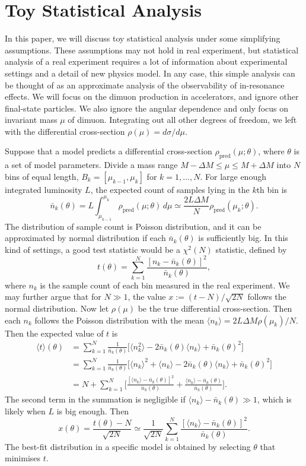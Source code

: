 \documentclass[11pt]{article}
\theoremstyle{definition}
\theoremstyle{remark}
\begin{document}
	\section{Toy Statistical Analysis}
	In this paper, we will discuss toy statistical analysis under some simplifying assumptions.
	These assumptions may not hold in real experiment, but statistical analysis of a real experiment requires a lot of information about experimental settings and a detail of new physics model.
	In any case, this simple analysis can be thought of as an approximate analysis of the observability of in-resonance effects.
	We will focus on the dimuon production in accelerators, and ignore other final-state particles.
	We also ignore the angular dependence and only focus on invariant mass $\mu$ of dimuon.
	Integrating out all other degrees of freedom, we left with the differential cross-section $\rho(\mu)=d\sigma/d\mu$.
	
	Suppose that a model predicts a differential cross-section $\rho_{\text{pred}}(\mu;\theta)$, where $\theta$ is a set of model parameters.
	Divide a mass range $M-\Delta M\leq\mu\leq M+\Delta M$ into $N$ bins of equal length, $B_{k}=[\mu_{k-1},\mu_{k}]$ for $k=1,\dots,N$.
	For large enough integrated luminosity $L$, the expected count of samples lying in the $k$th bin is
	\[\bar{n}_{k}(\theta)=L\int_{\mu_{k-1}}^{\mu_{k}}\rho_{\text{pred}}(\mu;\theta)\,d\mu\simeq\frac{2L\Delta M}{N}\rho_{\text{pred}}(\mu_{k};\theta).\]
	The distribution of sample count is Poisson distribution, and it can be approximated by normal distribution if each $\bar{n}_{k}(\theta)$ is sufficiently big.
	In this kind of settings, a good test statistic would be a $\chi^{2}(N)$ statistic, defined by
	\[t(\theta)=\sum_{k=1}^{N}\frac{[n_{k}-\bar{n}_{k}(\theta)]^{2}}{\bar{n}_{k}(\theta)},\]
	where $n_{k}$ is the sample count of each bin measured in the real experiment.
	We may further argue that for $N\gg1$, the value $x:=(t-N)/\sqrt{2N}$ follows the normal distribution.
	Now let $\rho(\mu)$ be the true differential cross-section.
	Then each $n_{k}$ follows the Poisson distribution with the mean $\langle n_{k}\rangle=2L\Delta M\rho(\mu_{k})/N$.
	Then the expected value of $t$ is
	\begin{align*}
		\langle t\rangle(\theta)&=\sum_{k=1}^{N}\frac{1}{\bar{n}_{k}(\theta)}\Big[\langle n_{k}^{2}\rangle-2\bar{n}_{k}(\theta)\langle n_{k}\rangle+\bar{n}_{k}(\theta)^{2}\Big]\\
		&=\sum_{k=1}^{N}\frac{1}{\bar{n}_{k}(\theta)}\Big[\langle n_{k}\rangle^{2}+\langle n_{k}\rangle-2\bar{n}_{k}(\theta)\langle n_{k}\rangle+\bar{n}_{k}(\theta)^{2}\Big]\\
		&=N+\sum_{k=1}^{N}\bigg[\frac{[\langle n_{k}\rangle-\bar{n}_{k}(\theta)]^{2}}{\bar{n}_{k}(\theta)}+\frac{\langle n_{k}\rangle-\bar{n}_{k}(\theta)}{\bar{n}_{k}(\theta)}\bigg].
	\end{align*}
	The second term in the summation is negligible if $\langle n_{k}\rangle-\bar{n}_{k}(\theta)\gg1$, which is likely when $L$ is big enough.
	Then
	\[x(\theta)=\frac{t(\theta)-N}{\sqrt{2N}}\simeq\frac{1}{\sqrt{2N}}\sum_{k=1}^{N}\frac{[\langle n_{k}\rangle-\bar{n}_{k}(\theta)]^{2}}{\bar{n}_{k}(\theta)}.\]
	The best-fit distribution in a specific model is obtained by selecting $\theta$ that minimises $t$.
	
\end{document}
